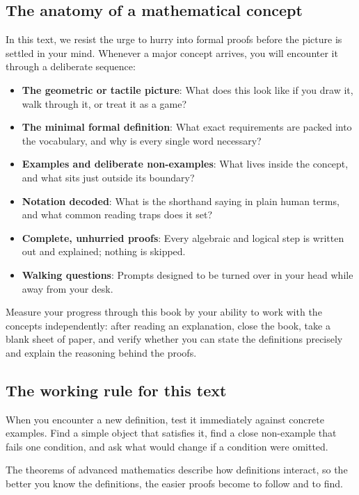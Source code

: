 \subsection*{The anatomy of a mathematical concept}

In this text, we resist the urge to hurry into formal proofs before the picture is settled in your mind. Whenever a major concept arrives, you will encounter it through a deliberate sequence:

\begin{itemize}
\item \textbf{The geometric or tactile picture}: What does this look like if you draw it, walk through it, or treat it as a game?
\item \textbf{The minimal formal definition}: What exact requirements are packed into the vocabulary, and why is every single word necessary?
\item \textbf{Examples and deliberate non-examples}: What lives inside the concept, and what sits just outside its boundary?
\item \textbf{Notation decoded}: What is the shorthand saying in plain human terms, and what common reading traps does it set?
\item \textbf{Complete, unhurried proofs}: Every algebraic and logical step is written out and explained; nothing is skipped.
\item \textbf{Walking questions}: Prompts designed to be turned over in your head while away from your desk.
\end{itemize}

\begin{focusbox}
Measure your progress through this book by your ability to work with the concepts independently: after reading an explanation, close the book, take a blank sheet of paper, and verify whether you can state the definitions precisely and explain the reasoning behind the proofs.
\end{focusbox}

\subsection*{The working rule for this text}

When you encounter a new definition, test it immediately against concrete examples. Find a simple object that satisfies it, find a close non-example that fails one condition, and ask what would change if a condition were omitted.

The theorems of advanced mathematics describe how definitions interact, so the better you know the definitions, the easier proofs become to follow and to find.

